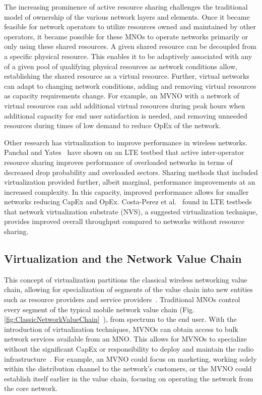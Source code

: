 \documentclass[12pt,dvipsnames]{report}
\begin{document}
The increasing prominence of active resource sharing challenges the traditional model of ownership of the various network layers and elements.  Once it became feasible for network operators to utilize resources owned and maintained by other operators, it became possible for these MNOs to operate networks primarily or only using these shared resources.  A given shared resource can be decoupled from a specific physical resource.  This enables it to be adaptively associated with any of a given pool of qualifying physical resources as network conditions allow, establishing the shared resource as a virtual resource.  Further, virtual networks can adapt to changing network conditions, adding and removing virtual resources as capacity requirements change.  For example, an MVNO with a network of virtual resources can add additional virtual resources during peak hours when additional capacity for end user satisfaction is needed, and removing unneeded resources during times of low demand to reduce OpEx of the network.

Other research has virtualization to improve performance in wireless networks.  Panchal and Yates~\cite{6571315} have shown on an LTE testbed that active inter-operator resource sharing improves performance of overloaded networks in terms of decreased drop probability and overloaded sectors.  Sharing methods that included virtualization provided further, albeit marginal, performance improvements at an increased complexity.  In this capacity, improved performance allows for smaller networks reducing CapEx and OpEx.  Costa-Perez et al.~\cite{6553675} found in LTE testbeds that network virtualization substrate (NVS), a suggested virtualization technique, provides improved overall throughput compared to networks without resource sharing.

\subsection{Virtualization and the Network Value Chain} \label{subsec:virtualization_valuechain}

This concept of virtualization partitions the classical wireless networking value chain, allowing for specialization of segments of the value chain into new entities such as resource providers and service providers~\cite{1421931}.  Traditional MNOs control every segment of the typical mobile network value chain (Fig. \ref{fig:ClassicNetworkValueChain}~\cite{6737248}), from spectrum to the end user.  With the introduction of virtualization techniques, MVNOs can obtain access to bulk network services available from an MNO.  This allows for MVNOs to specialize without the significant CapEx or responsibility to deploy and maintain the radio infrastructure~\cite{6737248}.  For example, an MVNO could focus on marketing, working solely within the distribution channel to the network's customers, or the MVNO could establish itself earlier in the value chain, focusing on operating the network from the core network.
\end{document}
